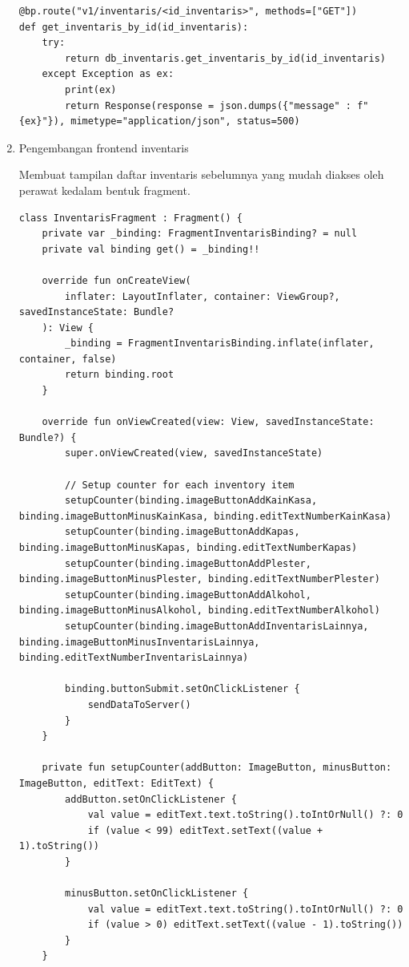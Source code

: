 \begin{enumerate}
\begin{lstlisting}
@bp.route("v1/inventaris/<id_inventaris>", methods=["GET"])
def get_inventaris_by_id(id_inventaris):
    try:
        return db_inventaris.get_inventaris_by_id(id_inventaris)
    except Exception as ex:
        print(ex)
        return Response(response = json.dumps({"message" : f"{ex}"}), mimetype="application/json", status=500)
\end{lstlisting}

\item Pengembangan frontend inventaris

Membuat tampilan daftar inventaris sebelumnya yang mudah diakses oleh perawat kedalam bentuk fragment.
\begin{lstlisting}
class InventarisFragment : Fragment() {
    private var _binding: FragmentInventarisBinding? = null
    private val binding get() = _binding!!

    override fun onCreateView(
        inflater: LayoutInflater, container: ViewGroup?, savedInstanceState: Bundle?
    ): View {
        _binding = FragmentInventarisBinding.inflate(inflater, container, false)
        return binding.root
    }

    override fun onViewCreated(view: View, savedInstanceState: Bundle?) {
        super.onViewCreated(view, savedInstanceState)

        // Setup counter for each inventory item
        setupCounter(binding.imageButtonAddKainKasa, binding.imageButtonMinusKainKasa, binding.editTextNumberKainKasa)
        setupCounter(binding.imageButtonAddKapas, binding.imageButtonMinusKapas, binding.editTextNumberKapas)
        setupCounter(binding.imageButtonAddPlester, binding.imageButtonMinusPlester, binding.editTextNumberPlester)
        setupCounter(binding.imageButtonAddAlkohol, binding.imageButtonMinusAlkohol, binding.editTextNumberAlkohol)
        setupCounter(binding.imageButtonAddInventarisLainnya, binding.imageButtonMinusInventarisLainnya, binding.editTextNumberInventarisLainnya)

        binding.buttonSubmit.setOnClickListener {
            sendDataToServer()
        }
    }

    private fun setupCounter(addButton: ImageButton, minusButton: ImageButton, editText: EditText) {
        addButton.setOnClickListener {
            val value = editText.text.toString().toIntOrNull() ?: 0
            if (value < 99) editText.setText((value + 1).toString())
        }

        minusButton.setOnClickListener {
            val value = editText.text.toString().toIntOrNull() ?: 0
            if (value > 0) editText.setText((value - 1).toString())
        }
    }


\end{lstlisting}
\end{enumerate}
